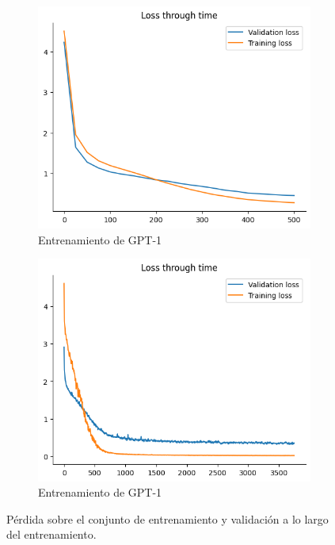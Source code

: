 \begin{figure}[tb]
    \centering
    \begin{subfigure}[b]{0.49\textwidth}
        \centering
        \includegraphics[width=\textwidth]{figures/chapter5/loss.png}
        \caption{Entrenamiento de GPT-1}
        \label{fig:loss}
    \end{subfigure}
    \begin{subfigure}[b]{0.49\textwidth}
        \centering
        \includegraphics[width=\textwidth]{figures/chapter5/loss_big.png}
        \caption{Entrenamiento de GPT-1}
        \label{fig:loss_big}
    \end{subfigure}
    \caption{Pérdida sobre el conjunto de entrenamiento y validación a lo largo del entrenamiento.}
\end{figure}

